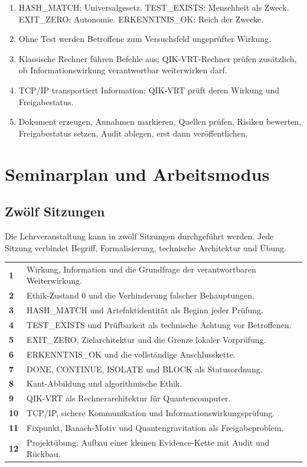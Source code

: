 \documentclass[11pt,a4paper,oneside]{book}
\begin{document}
\begin{enumerate}
\item HASH\_MATCH: Universalgesetz. TEST\_EXISTS: Menschheit als Zweck. EXIT\_ZERO: Autonomie. ERKENNTNIS\_OK: Reich der Zwecke.
\item Ohne Test werden Betroffene zum Versuchsfeld ungeprüfter Wirkung.
\item Klassische Rechner führen Befehle aus; QIK-VRT-Rechner prüfen zusätzlich, ob Informationswirkung verantwortbar weiterwirken darf.
\item TCP/IP transportiert Information; QIK-VRT prüft deren Wirkung und Freigabestatus.
\item Dokument erzeugen, Annahmen markieren, Quellen prüfen, Risiken bewerten, Freigabestatus setzen, Audit ablegen, erst dann veröffentlichen.
\end{enumerate}


\chapter{Seminarplan und Arbeitsmodus}

\section{Zwölf Sitzungen}

Die Lehrveranstaltung kann in zwölf Sitzungen durchgeführt werden. Jede Sitzung verbindet Begriff, Formalisierung, technische Architektur und Übung.

\begin{longtable}{>{\bfseries}p{}p{}}
\toprule
1 & Wirkung, Information und die Grundfrage der verantwortbaren Weiterwirkung. \\
2 & Ethik-Zustand 0 und die Verhinderung falscher Behauptungen. \\
3 & HASH\_MATCH und Artefaktidentität als Beginn jeder Prüfung. \\
4 & TEST\_EXISTS und Prüfbarkeit als technische Achtung vor Betroffenen. \\
5 & EXIT\_ZERO, Zielarchitektur und die Grenze lokaler Vorprüfung. \\
6 & ERKENNTNIS\_OK und die vollständige Anschlusskette. \\
7 & DONE, CONTINUE, ISOLATE und BLOCK als Statusordnung. \\
8 & Kant-Abbildung und algorithmische Ethik. \\
9 & QIK-VRT als Rechnerarchitektur für Quantencomputer. \\
10 & TCP/IP, sichere Kommunikation und Informationswirkungsprüfung. \\
11 & Fixpunkt, Banach-Motiv und Quantengravitation als Freigabeproblem. \\
12 & Projektübung: Aufbau einer kleinen Evidence-Kette mit Audit und Rückbau. \\
\bottomrule
\end{longtable}
\end{document}
